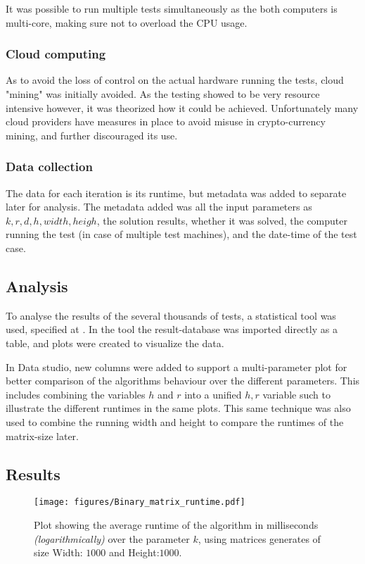 \documentclass[a4paper]{article}
\begin{document}
It was possible to run multiple tests simultaneously as the both computers is multi-core, making sure not to overload
the CPU usage.

\subsubsection{Cloud computing}
As to avoid the loss of control on the actual hardware running the tests, cloud "mining" was initially
avoided. As the testing showed to be very resource intensive however, it was theorized how it could be achieved.
Unfortunately many cloud providers have measures in place to avoid misuse in crypto-currency mining, and further
discouraged its use.

\subsubsection{Data collection}
The data for each iteration is its runtime, but metadata was added to separate later for analysis. The
metadata added was all the input parameters as $k,r,d,h, width, heigh$, the solution results, whether it was solved, the
computer running the test (in case of multiple test machines), and the date-time of the test case.

\subsection{Analysis}
To analyse the results of the several thousands of tests, a statistical tool was used, specified at
. In the tool the result-database was imported directly as a table, and plots were
created to visualize the data.

In Data studio, new columns were added to support a multi-parameter plot for better comparison of the
algorithms behaviour over the different parameters. This includes combining the variables $h$ and $r$ into
a unified $h, r$ variable such to illustrate the different runtimes in the same plots. This same technique was
also used to combine the running width and height to compare the runtimes of the matrix-size later.

\subsection{Results}
\begin{figure}[H]
    \centering
    \texttt{[image: figures/Binary\_matrix\_runtime.pdf]}
    \caption{Plot showing the average runtime of the algorithm in milliseconds \textit{(logarithmically)}
        over the parameter $k$, using matrices generates of size Width: $1000$ and Height:$1000$.}
    \label{fig:res-1000x1000k}
\end{figure}
\end{document}
